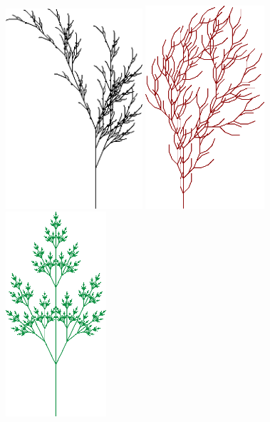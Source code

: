 \documentclass[ignorenonframetext,compress]{beamer}
\begin{document}
\begin{frame}[fragile]
	\frametitle{}
\begin{center}
\includegraphics[width=0.38\textwidth]{tree.png}
\includegraphics[width=0.33\textwidth]{tree2.png}
\includegraphics[width=0.28\textwidth]{tree3.png}
\end{center}
\end{frame}
\end{document}
